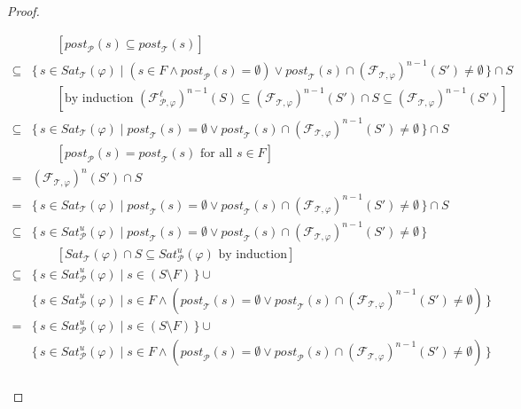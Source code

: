 \documentclass[12pt]{article}
\theoremstyle{definition}
\newcommand{\comment}[1]{\hspace{2em}[\mbox{#1}]}
\begin{document}
\begin{proof}
\begin{itemize}
\begin{align*}
& \comment{$\mathit{post}_{\mathcal{P}}(s) \subseteq \mathit{post}_{\mathcal{T}}(s)$}\\
\subseteq & \{\, s \in \mathit{Sat}_{\mathcal{T}}(\varphi) \mid (s \in F \wedge \mathit{post}_{\mathcal{P}}(s) = \emptyset) \vee \mathit{post}_{\mathcal{T}}(s) \cap (\mathcal{F}_{\mathcal{T}, \varphi})^{n-1}(S') \not= \emptyset \,\} \cap S\\
& \comment{by induction $(\mathcal{F}_{\mathcal{P}, \varphi}^{\ell})^{n-1}(S)
\subseteq (\mathcal{F}_{\mathcal{T}, \varphi})^{n-1}(S') \cap S \subseteq (\mathcal{F}_{\mathcal{T}, \varphi})^{n-1}(S')$}\\
\subseteq & \{\, s \in \mathit{Sat}_{\mathcal{T}}(\varphi) \mid \mathit{post}_{\mathcal{T}}(s) = \emptyset \vee \mathit{post}_{\mathcal{T}}(s) \cap (\mathcal{F}_{\mathcal{T}, \varphi})^{n-1}(S') \not= \emptyset \,\} \cap S\\
& \comment{$\mathit{post}_{\mathcal{P}}(s) = \mathit{post}_{\mathcal{T}}(s)$ for all $s \in F$}\\
= & (\mathcal{F}_{\mathcal{T}, \varphi})^{n}(S') \cap S\\
= & \{\, s \in \mathit{Sat}_{\mathcal{T}}(\varphi) \mid \mathit{post}_{\mathcal{T}}(s) = \emptyset \vee \mathit{post}_{\mathcal{T}}(s) \cap (\mathcal{F}_{\mathcal{T}, \varphi})^{n-1}(S') \not= \emptyset \,\} \cap S\\
\subseteq & \{\, s \in \mathit{Sat}^u_{\mathcal{P}}(\varphi) \mid \mathit{post}_{\mathcal{T}}(s) = \emptyset \vee \mathit{post}_{\mathcal{T}}(s) \cap (\mathcal{F}_{\mathcal{T}, \varphi})^{n-1}(S') \not= \emptyset \,\}\\
& \comment{$\mathit{Sat}_{\mathcal{T}}(\varphi) \cap S \subseteq \mathit{Sat}^u_{\mathcal{P}}(\varphi)$ by induction}\\
\subseteq & \{\, s \in \mathit{Sat}^u_{\mathcal{P}}(\varphi) \mid s \in (S \setminus F) \,\} \cup\\
& \{\, s \in \mathit{Sat}^u_{\mathcal{P}}(\varphi) \mid s \in F \wedge (\mathit{post}_{\mathcal{T}}(s) = \emptyset \vee \mathit{post}_{\mathcal{T}}(s) \cap (\mathcal{F}_{\mathcal{T}, \varphi})^{n-1}(S') \not= \emptyset) \,\}\\
= & \{\, s \in \mathit{Sat}^u_{\mathcal{P}}(\varphi) \mid s \in (S \setminus F) \,\} \cup\\
& \{\, s \in \mathit{Sat}^u_{\mathcal{P}}(\varphi) \mid s \in F \wedge (\mathit{post}_{\mathcal{P}}(s) = \emptyset \vee \mathit{post}_{\mathcal{P}}(s) \cap (\mathcal{F}_{\mathcal{T}, \varphi})^{n-1}(S') \not= \emptyset) \,\}\\

\end{align*}
\end{itemize}
\end{proof}
\end{document}
